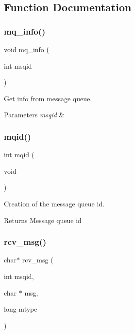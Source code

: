 \subsection{Function Documentation}
\mbox{\label{mq_8c_ad6373ac4d80e0c6198e95bb3a0515ff4}} 
\subsubsection{mq\+\_\+info()}
{\footnotesize\ttfamily void mq\+\_\+info (\begin{DoxyParamCaption}\item[{int}]{msqid }\end{DoxyParamCaption})}



Get info from message queue. 


\begin{DoxyParams}{Parameters}
{\em msqid} & \\
\hline
\end{DoxyParams}
\mbox{\label{mq_8c_aa6a2e92e60754c750bebd73bced350fd}} 
\subsubsection{mqid()}
{\footnotesize\ttfamily int mqid (\begin{DoxyParamCaption}\item[{void}]{ }\end{DoxyParamCaption})}



Creation of the message queue id. 

\begin{DoxyReturn}{Returns}
Message queue id 
\end{DoxyReturn}
\mbox{\label{mq_8c_a9fdea1732b3a3772bedad98f1a635e08}} 
\subsubsection{rcv\+\_\+msg()}
{\footnotesize\ttfamily char$\ast$ rcv\+\_\+msg (\begin{DoxyParamCaption}\item[{int}]{msqid,  }\item[{char $\ast$}]{msg,  }\item[{long}]{mtype }\end{DoxyParamCaption})}



